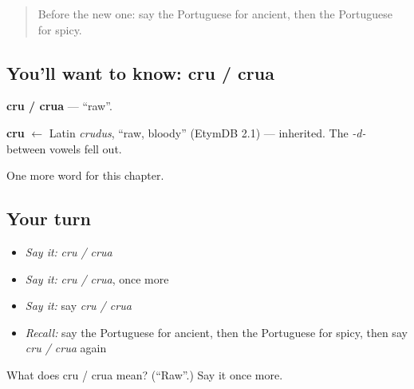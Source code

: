 \label{lesson:PT-C216-cru-crua}



\begin{quote}
Before the new one: say the Portuguese for ancient, then the Portuguese for spicy.
\end{quote}

\subsection*{You'll want to know: cru / crua}
\textbf{cru / crua} — \textquotedblleft{}raw\textquotedblright{}.

\begin{cousinweb}
\textbf{cru} $\leftarrow$ Latin \emph{crudus}, \textquotedblleft{}raw, bloody\textquotedblright{} (EtymDB 2.1) — inherited. The \emph{-d-} between vowels fell out.
\end{cousinweb}

\begin{grammarlens}[title={What you've built}]
One more word for this chapter.
\end{grammarlens}

\subsection*{Your turn}
\begin{itemize}
\raggedright
  \item \emph{Say it:} \emph{cru / crua}
  \item \emph{Say it:} \emph{cru / crua}, once more
  \item \emph{Say it:} say \emph{cru / crua}
  \item \emph{Recall:} say the Portuguese for ancient, then the Portuguese for spicy, then say \emph{cru / crua} again
\end{itemize}

\begin{tcolorbox}[breakable,colback=teal!4,colframe=teal!35!black,title={Before you move on}]
What does cru / crua mean? (\textquotedblleft{}Raw\textquotedblright{}.) Say it once more.
\end{tcolorbox}
